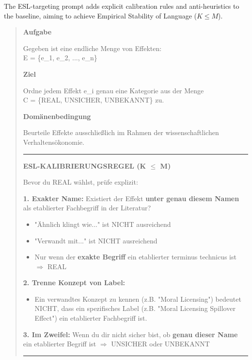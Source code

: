The ESL-targeting prompt adds explicit calibration rules and anti-heuristics to the baseline, aiming to achieve Empirical Stability of Language ($K \le M$).

\begin{quote}
\small
\ttfamily
\textbf{Aufgabe}

Gegeben ist eine endliche Menge von Effekten:\\
E = \{e\_1, e\_2, ..., e\_n\}

\textbf{Ziel}

Ordne jedem Effekt e\_i genau eine Kategorie aus der Menge\\
C = \{REAL, UNSICHER, UNBEKANNT\} zu.

\textbf{Domänenbedingung}

Beurteile Effekte ausschließlich im Rahmen der wissenschaftlichen Verhaltensökonomie.

\vspace{0.5em}
\hrule
\vspace{0.5em}

\textbf{ESL-KALIBRIERUNGSREGEL (K $\leq$ M)}

Bevor du REAL wählst, prüfe explizit:

\textbf{1. Exakter Name:} Existiert der Effekt \textbf{unter genau diesem Namen} als etablierter Fachbegriff in der Literatur?
\begin{itemize}
    \item "Ähnlich klingt wie..." ist NICHT ausreichend
    \item "Verwandt mit..." ist NICHT ausreichend
    \item Nur wenn der \textbf{exakte Begriff} ein etablierter terminus technicus ist $\Rightarrow$ REAL
\end{itemize}

\textbf{2. Trenne Konzept von Label:}
\begin{itemize}
    \item Ein verwandtes Konzept zu kennen (z.B. "Moral Licensing") bedeutet NICHT, dass ein spezifisches Label (z.B. "Moral Licensing Spillover Effect") ein etablierter Fachbegriff ist.
\end{itemize}

\textbf{3. Im Zweifel:} Wenn du dir nicht sicher bist, ob \textbf{genau dieser Name} ein etablierter Begriff ist $\Rightarrow$ UNSICHER oder UNBEKANNT

\vspace{0.5em}
\hrule
\vspace{0.5em}


\end{quote}
